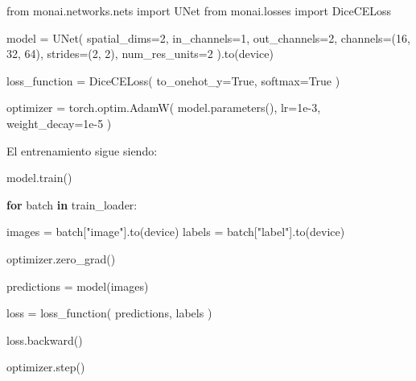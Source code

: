 \documentclass[
  letterpaper,
  DIV=11,
  numbers=noendperiod]{scrartcl}
\newenvironment{Shaded}{\begin{snugshade}}{\end{snugshade}}
\newcommand{\ControlFlowTok}[1]{\textcolor[rgb]{0.00,0.23,0.31}{\textbf{#1}}}
\newcommand{\DecValTok}[1]{\textcolor[rgb]{0.68,0.00,0.00}{#1}}
\newcommand{\FloatTok}[1]{\textcolor[rgb]{0.68,0.00,0.00}{#1}}
\newcommand{\ImportTok}[1]{\textcolor[rgb]{0.00,0.46,0.62}{#1}}
\newcommand{\KeywordTok}[1]{\textcolor[rgb]{0.00,0.23,0.31}{\textbf{#1}}}
\newcommand{\NormalTok}[1]{\textcolor[rgb]{0.00,0.23,0.31}{#1}}
\newcommand{\OperatorTok}[1]{\textcolor[rgb]{0.37,0.37,0.37}{#1}}
\newcommand{\StringTok}[1]{\textcolor[rgb]{0.13,0.47,0.30}{#1}}
\newcommand{\VariableTok}[1]{\textcolor[rgb]{0.07,0.07,0.07}{#1}}
\begin{document}
\begin{Shaded}
\begin{Highlighting}[]
\ImportTok{from}\NormalTok{ monai.networks.nets }\ImportTok{import}\NormalTok{ UNet}
\ImportTok{from}\NormalTok{ monai.losses }\ImportTok{import}\NormalTok{ DiceCELoss}

\NormalTok{model }\OperatorTok{=}\NormalTok{ UNet(}
\NormalTok{    spatial\_dims}\OperatorTok{=}\DecValTok{2}\NormalTok{,}
\NormalTok{    in\_channels}\OperatorTok{=}\DecValTok{1}\NormalTok{,}
\NormalTok{    out\_channels}\OperatorTok{=}\DecValTok{2}\NormalTok{,}
\NormalTok{    channels}\OperatorTok{=}\NormalTok{(}\DecValTok{16}\NormalTok{, }\DecValTok{32}\NormalTok{, }\DecValTok{64}\NormalTok{),}
\NormalTok{    strides}\OperatorTok{=}\NormalTok{(}\DecValTok{2}\NormalTok{, }\DecValTok{2}\NormalTok{),}
\NormalTok{    num\_res\_units}\OperatorTok{=}\DecValTok{2}
\NormalTok{).to(device)}

\NormalTok{loss\_function }\OperatorTok{=}\NormalTok{ DiceCELoss(}
\NormalTok{    to\_onehot\_y}\OperatorTok{=}\VariableTok{True}\NormalTok{,}
\NormalTok{    softmax}\OperatorTok{=}\VariableTok{True}
\NormalTok{)}

\NormalTok{optimizer }\OperatorTok{=}\NormalTok{ torch.optim.AdamW(}
\NormalTok{    model.parameters(),}
\NormalTok{    lr}\OperatorTok{=}\FloatTok{1e{-}3}\NormalTok{,}
\NormalTok{    weight\_decay}\OperatorTok{=}\FloatTok{1e{-}5}
\NormalTok{)}
\end{Highlighting}
\end{Shaded}

El entrenamiento sigue siendo:

\begin{Shaded}
\begin{Highlighting}[]
\NormalTok{model.train()}

\ControlFlowTok{for}\NormalTok{ batch }\KeywordTok{in}\NormalTok{ train\_loader:}

\NormalTok{    images }\OperatorTok{=}\NormalTok{ batch[}\StringTok{"image"}\NormalTok{].to(device)}
\NormalTok{    labels }\OperatorTok{=}\NormalTok{ batch[}\StringTok{"label"}\NormalTok{].to(device)}

\NormalTok{    optimizer.zero\_grad()}

\NormalTok{    predictions }\OperatorTok{=}\NormalTok{ model(images)}

\NormalTok{    loss }\OperatorTok{=}\NormalTok{ loss\_function(}
\NormalTok{        predictions,}
\NormalTok{        labels}
\NormalTok{    )}

\NormalTok{    loss.backward()}

\NormalTok{    optimizer.step()}
\end{Highlighting}
\end{Shaded}
\end{document}
